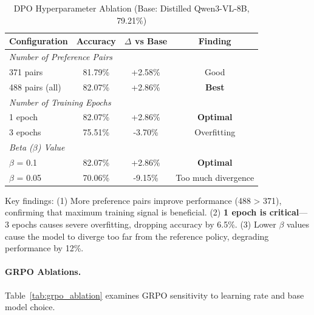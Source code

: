 \documentclass[11pt,a4paper]{article}
\begin{document}
\begin{table}[h]
\centering
\caption{DPO Hyperparameter Ablation (Base: Distilled Qwen3-VL-8B, 79.21\%)}
\label{tab:dpo_ablation}
\begin{tabular}{lccc}
\toprule
\textbf{Configuration} & \textbf{Accuracy} & \textbf{$\Delta$ vs Base} & \textbf{Finding} \\
\midrule
\multicolumn{4}{l}{\textit{Number of Preference Pairs}} \\
371 pairs & 81.79\% & +2.58\% & Good \\
488 pairs (all) & 82.07\% & +2.86\% & \textbf{Best} \\
\midrule
\multicolumn{4}{l}{\textit{Number of Training Epochs}} \\
1 epoch & 82.07\% & +2.86\% & \textbf{Optimal} \\
3 epochs & 75.51\% & -3.70\% & Overfitting \\
\midrule
\multicolumn{4}{l}{\textit{Beta ($\beta$) Value}} \\
$\beta$ = 0.1 & 82.07\% & +2.86\% & \textbf{Optimal} \\
$\beta$ = 0.05 & 70.06\% & -9.15\% & Too much divergence \\
\bottomrule
\end{tabular}
\end{table}

Key findings: (1) More preference pairs improve performance (488 > 371), confirming that maximum training signal is beneficial. (2) \textbf{1 epoch is critical}---3 epochs causes severe overfitting, dropping accuracy by 6.5\%. (3) Lower $\beta$ values cause the model to diverge too far from the reference policy, degrading performance by 12\%.

\paragraph{GRPO Ablations.} Table~\ref{tab:grpo_ablation} examines GRPO sensitivity to learning rate and base model choice.
\end{document}
